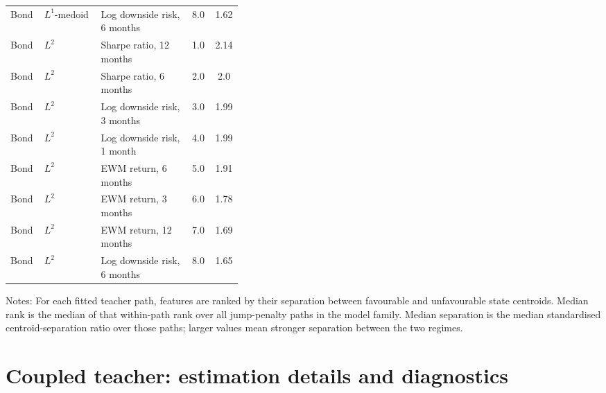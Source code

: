 \begin{table}[H]
\begin{tabular}{llp{0.39\linewidth}cc}
Bond & $L^1$-medoid & Log downside risk, 6 months & 8.0 & 1.62 \\
Bond & $L^2$ & Sharpe ratio, 12 months & 1.0 & 2.14 \\
Bond & $L^2$ & Sharpe ratio, 6 months & 2.0 & 2.0 \\
Bond & $L^2$ & Log downside risk, 3 months & 3.0 & 1.99 \\
Bond & $L^2$ & Log downside risk, 1 month & 4.0 & 1.99 \\
Bond & $L^2$ & EWM return, 6 months & 5.0 & 1.91 \\
Bond & $L^2$ & EWM return, 3 months & 6.0 & 1.78 \\
Bond & $L^2$ & EWM return, 12 months & 7.0 & 1.69 \\
Bond & $L^2$ & Log downside risk, 6 months & 8.0 & 1.65 \\
\bottomrule
\end{tabular}
\par\vspace{0.35em}
\begin{minipage}{0.92\linewidth}
\footnotesize Notes: For each fitted teacher path, features are ranked by their separation between favourable and unfavourable state centroids. Median rank is the median of that within-path rank over all jump-penalty paths in the model family. Median separation is the median standardised centroid-separation ratio over those paths; larger values mean stronger separation between the two regimes.
\end{minipage}
\end{table}

\section{Coupled teacher: estimation details and diagnostics}
\label{app:teacher-coupled}

